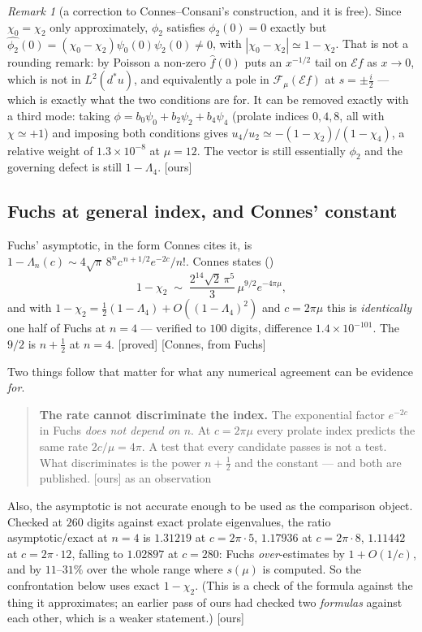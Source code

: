 \documentclass[11pt,a4paper]{article}
\theoremstyle{plain}
\theoremstyle{definition}
\theoremstyle{remark}
\newtheorem{remark}[theorem]{Remark}
\newcommand{\st}[1]{{\normalfont\sffamily\footnotesize[#1]}}
\newcommand{\proved}{\st{proved}}
\newcommand{\ours}{{\normalfont\sffamily\footnotesize[ours]}}
\newcommand{\theirs}[1]{{\normalfont\sffamily\footnotesize[#1]}}
\newcommand{\E}{\mathcal{E}}
\newcommand{\F}{\mathcal{F}}
\newcommand{\file}[1]{\path{#1}}
\begin{document}
\begin{remark}[a correction to Connes--Consani's construction, and it is free]
\label{rem:thirdmode}
Since $\chi_0=\chi_2$ only approximately, $\phi_2$ satisfies $\phi_2(0)=0$
exactly but
$\widehat{\phi_2}(0)=(\chi_0-\chi_2)\psi_0(0)\psi_2(0)\neq0$, with
$|\chi_0-\chi_2|\simeq1-\chi_2$.  That is not a rounding remark: by Poisson a
non-zero $\widehat f(0)$ puts an $x^{-1/2}$ tail on $\E f$ as $x\to0$, which is
not in $L^2(d^*u)$, and equivalently a pole in $\F_\mu(\E f)$ at $s=\pm\tfrac i2$
--- which is exactly what the two conditions are for.  It can be removed exactly
with a third mode: taking $\phi=b_0\psi_0+b_2\psi_2+b_4\psi_4$ (prolate indices
$0,4,8$, all with $\chi\simeq+1$) and imposing both conditions gives
$u_4/u_2\simeq-(1-\chi_2)/(1-\chi_4)$, a relative weight of $1.3\times10^{-8}$ at
$\mu=12$.  The vector is still essentially $\phi_2$ and the governing defect is
still $1-\Lambda_4$. \ours
\end{remark}

\subsection{Fuchs at general index, and Connes' constant}
\label{sec:fuchs}

Fuchs' asymptotic, in the form Connes cites it, is
$1-\Lambda_n(c)\sim4\sqrt\pi\,8^nc^{\,n+1/2}e^{-2c}/n!$.  Connes states
(\file{rhready.tex:1149})
\[
  1-\chi_2\;\sim\;\frac{2^{14}\sqrt2\,\pi^5}{3}\,\mu^{9/2}e^{-4\pi\mu},
\]
and with $1-\chi_2=\tfrac12(1-\Lambda_4)+O((1-\Lambda_4)^2)$ and $c=2\pi\mu$
this is \emph{identically} one half of Fuchs at $n=4$ --- verified to $100$
digits, difference $1.4\times10^{-101}$.  The $9/2$ is $n+\tfrac12$ at $n=4$.
\proved{} \theirs{Connes, from Fuchs}

Two things follow that matter for what any numerical agreement can be evidence
\emph{for}.

\begin{quote}
\textbf{The rate cannot discriminate the index.}  The exponential factor
$e^{-2c}$ in Fuchs \emph{does not depend on $n$}.  At $c=2\pi\mu$ every prolate
index predicts the same rate $2c/\mu=4\pi$.  A test that every candidate passes
is not a test.  What discriminates is the power $n+\tfrac12$ and the constant ---
and both are published. \ours{} as an observation
\end{quote}

\noindent Also, the asymptotic is not accurate enough to be used as the
comparison object.  Checked at $260$ digits against exact prolate eigenvalues,
the ratio asymptotic/exact at $n=4$ is $1.31219$ at $c=2\pi\cdot5$, $1.17936$ at
$c=2\pi\cdot8$, $1.11442$ at $c=2\pi\cdot12$, falling to $1.02897$ at $c=280$:
Fuchs \emph{over}-estimates by $1+O(1/c)$, and by $11$--$31\%$ over the whole
range where $s(\mu)$ is computed.  So the confrontation below uses exact
$1-\chi_2$.  (This is a check of the formula against the thing it approximates;
an earlier pass of ours had checked two \emph{formulas} against each other,
which is a weaker statement.) \ours
\end{document}
